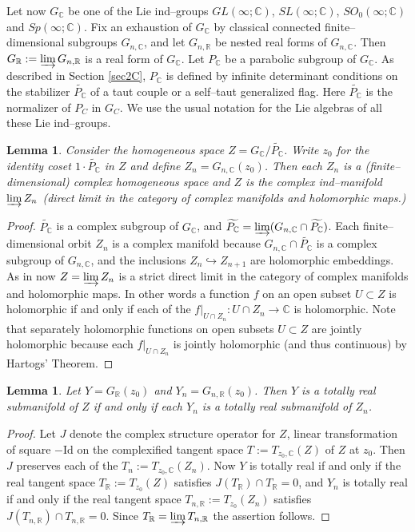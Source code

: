 \documentclass[oneside,leqno,11pt]{article}
\def\C{\mathbb{C}}
\def\R{\mathbb{R}}
\newtheorem{lemma}[equation]{Lemma}
\begin{document}
Let now $G_\C$ be one of the Lie ind--groups $GL(\infty;\C)$, $SL(\infty;\C)$, 
$SO_0(\infty;\C)$ and $Sp(\infty;\C)$.  Fix an exhaustion of $G_\C$ by 
classical connected finite--dimensional subgroups $G_{n,\C}$, and let 
$G_{n,\R}$ be nested real forms of $G_{n,\C}$.  Then 
$G_\R := \varinjlim G_{n,\R}$ is a real form of $G_\C$.
Let $P_\C$ be a parabolic subgroup of $G_\C$.  As 
described in Section \ref{sec2C},
$P_\C$ is defined by infinite determinant conditions on the stabilizer 
$\widetilde{P_\C}$ of a taut couple 
or a self--taut generalized flag.  Here $\widetilde{P_\C}$ is the normalizer
of $P_C$ in $G_C$.
We use the usual notation for the Lie algebras of all these Lie ind--groups.

\begin{lemma} \label{totreal1}
Consider the homogeneous space $Z = G_\C/\widetilde{P_\C}$.  
Write $z_0$ for the identity coset $1\cdot\widetilde{P_\C}$ in $Z$ and 
define $Z_n = G_{n,\C}(z_0)$.  Then each $Z_n$ 
is a (finite--dimensional) complex homogeneous space and 
$Z$ is the complex ind--manifold $\varinjlim Z_n$ (direct limit 
in the category of complex manifolds and holomorphic maps.)
\end{lemma}

\begin{proof} $\widetilde{P_\C}$ is a complex subgroup of $G_\C$, and
$\widetilde{P_\C} = \varinjlim (G_{n,\C}\cap \widetilde{P_\C})$.  Each
finite--dimensional orbit $Z_n$ is a complex manifold because 
$G_{n,\C}\cap \widetilde{P_\C}$ is a complex subgroup of $G_{n,\C}$, and
the inclusions $Z_n \hookrightarrow Z_{n+1}$ are holomorphic embeddings.  
As in \cite{NRW} now $Z = \varinjlim Z_n$ is a strict direct limit in the
category of complex manifolds and holomorphic maps.  In other words a
function $f$ on an open subset $U \subset Z$ is holomorphic if and only if
each of the $f|_{U\cap Z_n} : U\cap Z_n \to \C$ is holomorphic.  Note that
separately holomorphic functions on open subsets $U \subset Z$ are jointly 
holomorphic because each $f|_{U\cap Z_n}$ is jointly holomorphic (and thus
continuous) by Hartogs' Theorem.
\end{proof}


\begin{lemma} \label{totreal2}
Let $Y = G_\R(z_0)$ and $Y_n = G_{n,\R}(z_0)$.  Then $Y$ is
a totally real submanifold of $Z$ if and only if each $Y_n$ is a totally
real submanifold of $Z_n$.
\end{lemma}

\begin{proof}
Let $J$ denote the complex structure operator
for $Z$, linear transformation of square $-\mathrm{Id}$ on the complexified tangent
space $T:=T_{z_0,\C}(Z)$ of $Z$ at $z_0$.  Then $J$ preserves each of the
$T_n:=T_{z_0,\C}(Z_n)$.  Now $Y$ is totally real if and only if the real
tangent space $T_\R := T_{z_0}(Z)$ satisfies $J(T_\R) \cap T_\R =0$, and
$Y_n$ is totally real if and only if the real tangent space $T_{n,\R}
:= T_{z_0}(Z_n)$ satisfies $J(T_{n,\R}) \cap T_{n,\R} = 0$.  Since
$T_\R = \varinjlim T_{n,\R}$ the assertion follows.
\end{proof}
\end{document}
